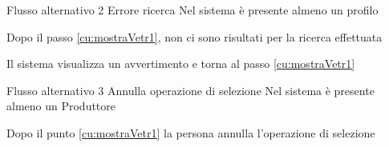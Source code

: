 %
%
{Flusso alternativo 2}%
{Errore ricerca}%
{Nel sistema è presente almeno un profilo}%
{\postNulle}%
{\begin{enumCU}
	\item Dopo il passo \ref{cu:mostraVetr1}, non ci sono risultati per la ricerca effettuata
	\item Il sistema visualizza un avvertimento e torna al passo \ref{cu:mostraVetr1}
\end{enumCU}}%
%	
{Flusso alternativo 3}%
{Annulla operazione di selezione}%
{Nel sistema è presente almeno un Produttore}%
{\postNulle}%
{\begin{enumCU}
		\item Dopo il punto \ref{cu:mostraVetr1} la persona annulla l'operazione di selezione
\end{enumCU}}%



%
%

